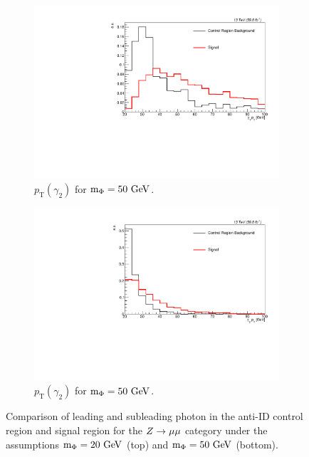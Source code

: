 \begin{figure}[htb!]
\begin{subfigure}[h]{0.45\linewidth}
		\includegraphics[width=\linewidth]{figs/05_analysis/2018_ZX_g1_pt_mx50_MU_comp.pdf}
		\caption{$p_\mathrm{T}(\gamma_2)$ for $\mphi=50\unit{GeV}$.}
	\end{subfigure}
	\begin{subfigure}[h]{0.45\linewidth}
		\centering
		\includegraphics[width=\linewidth]{figs/05_analysis/2018_ZX_g2_pt_mx50_MU_comp.pdf}
		\caption{$p_\mathrm{T}(\gamma_2)$ for $\mphi=50\unit{GeV}$.}
	\end{subfigure}
	\caption[Comparison of leading and subleading photon \pt in the anti-ID control region and signal region for the $\VZ\to\mu\mu$ category under the assumptions $\mphi=20\unit{GeV}$ (top) and $\mphi=50\unit{GeV}$ (bottom).]{Comparison of leading and subleading photon \pt in the anti-ID control region and signal region for the $\VZ\to\mu\mu$ category under the assumptions $\mphi=20\unit{GeV}$ (top) and $\mphi=50\unit{GeV}$ (bottom).}
	\label{fig:pt_comparison}
\end{figure}

